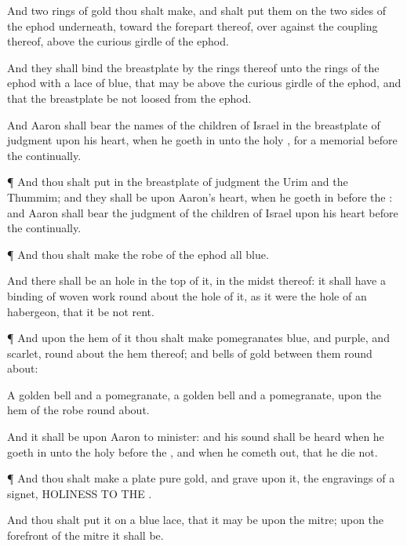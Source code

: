 {And
two
{}
rings of
gold thou shalt
make, and shalt
put them on the
two
sides of the
ephod
underneath,
toward the
forepart thereof, over
against the
{}
coupling thereof,
above the curious
girdle of the
ephod.

And they shall
bind the
breastplate by the
rings thereof unto the
rings of the
ephod with a
lace of
blue, that
{} may be above the curious
girdle of the
ephod, and that the
breastplate be not
loosed from the
ephod.

And
Aaron shall
bear the
names of the
children of
Israel in the
breastplate of
judgment upon his
heart, when he
goeth in unto the
holy
{}, for a
memorial
before the
{}
continually.


\par }{\PP {}¶ And thou shalt
put in the
breastplate of
judgment the
Urim and the
Thummim; and they shall be upon
Aaron’s
heart, when he
goeth in
before the
{}: and
Aaron shall
bear the
judgment of the
children of
Israel upon his
heart
before the
{}
continually.


\par }{\PP {}¶ And thou shalt
make the
robe of the
ephod
all
{}
blue.

And there shall be an
hole in the
top of it, in the
midst thereof: it shall have a
binding of
woven
work round
about the
hole of it, as it were the
hole of an
habergeon, that it be not
rent.


\par }{\PP {}¶ And
{} upon the
hem of it thou shalt
make
pomegranates
{}
blue, and
{}
purple, and
{}
scarlet, round
about the
hem thereof; and
bells of
gold
between them round
about:

A
golden
bell and a
pomegranate, a
golden
bell and a
pomegranate, upon the
hem of the
robe round
about.

And it shall be upon
Aaron to
minister: and his
sound shall be
heard when he
goeth in unto the
holy
{}
before the
{}, and when he
cometh out, that he
die not.


\par }{\PP {}¶ And thou shalt
make a
plate
{}
pure
gold, and
grave upon it,
{} the
engravings of a
signet,
HOLINESS TO THE
{}.

And thou shalt
put it on a
blue
lace, that it may be upon the
mitre; upon the
forefront of the
mitre it shall be.

}
